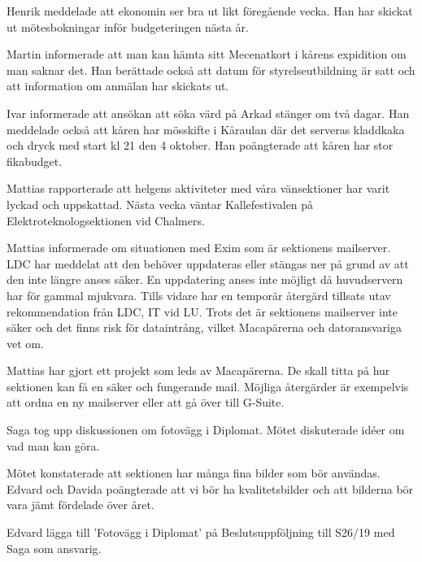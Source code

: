 \documentclass[10pt]{article}
\begin{document}
\begin{paragrafer}
\begin{paragrafer}
Henrik meddelade att ekonomin ser bra ut likt föregående vecka. Han har skickat ut mötesbokningar inför budgeteringen nästa år.


Martin informerade att man kan hämta sitt Mecenatkort i kårens expidition om man saknar det.
Han berättade också att datum för styrelseutbildning är satt och att information om anmälan har skickats ut. 

Ivar informerade att ansökan att söka värd på Arkad stänger om två dagar. 
Han meddelade också att kåren har mösskifte i Kåraulan där det serveras kladdkaka och dryck med start kl 21 den 4 oktober. Han poängterade att kåren har stor fikabudget. 


Mattias rapporterade att helgens aktiviteter med våra vänsektioner har varit lyckad och uppskattad. Nästa vecka väntar Kallefestivalen på Elektroteknologsektionen vid Chalmers. 

\end{paragrafer}


Mattias informerade om situationen med Exim som är sektionens mailserver. 
LDC har meddelat att den behöver uppdateras eller stängas ner på grund av att den inte längre anses säker. En uppdatering anses inte möjligt då huvudservern har för gammal mjukvara. 
Tills vidare har en temporär återgärd tillsats utav rekommendation från LDC, IT vid LU. Trots det är sektionens mailserver inte säker och det finns risk för dataintrång, vilket Macapärerna och datoransvariga vet om. 

Mattias har gjort ett projekt som leds av Macapärerna. De skall titta på hur sektionen kan få en säker och fungerande mail. Möjliga återgärder är exempelvis att ordna en ny mailserver eller att gå över till G-Suite.


Saga tog upp diskussionen om fotovägg i Diplomat. Mötet diskuterade idéer om vad man kan göra. 

Mötet konstaterade att sektionen har många fina bilder som bör användas. Edvard och Davida poängterade att vi bör ha kvalitetsbilder och att bilderna bör vara jämt fördelade över året. 

Edvard \ypa lägga till 'Fotovägg i Diplomat' på Beslutsuppföljning till S26/19 med Saga som ansvarig. 


\end{paragrafer}
\end{document}
